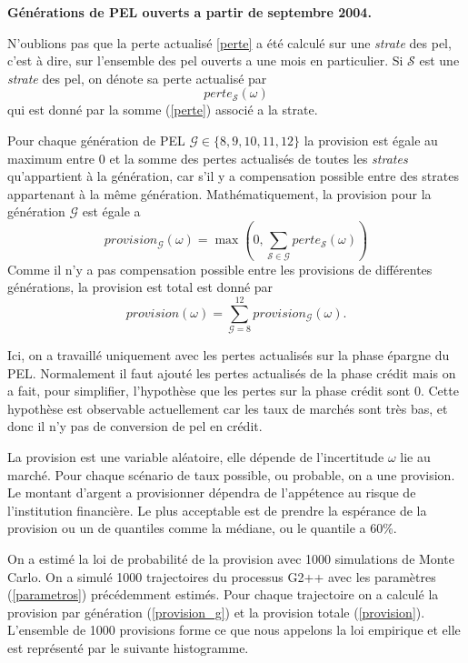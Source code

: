 \documentclass[12pt, a4paper]{book}
\begin{document}
\begin{table}[h!]
	\caption{\bf Générations de PEL ouverts a partir de septembre 2004.}
	\bigskip	
	\label{generation_pel}
	\centering
\end{table}

N'oublions pas que la perte actualisé \ref{perte} a été calculé sur une {\it strate} des pel, c'est à dire, sur l'ensemble des pel ouverts a une mois en particulier. Si $\mathcal{S}$ est une {\it strate} des pel, on dénote sa perte actualisé par 
$$ perte_{\mathcal S}(\omega)$$
qui est donné par la somme (\ref{perte}) associé a la strate.

Pour chaque génération de PEL $\mathcal{G} \in \{8, 9, 10, 11, 12\}$ la provision est égale au maximum entre $0$ et la somme des pertes actualisés de toutes les {\it strates} qu'appartient à la génération, car s'il y a compensation possible entre des strates appartenant à la même génération. Mathématiquement, la provision pour la génération $\mathcal{G}$ est égale a
\begin{equation}
\label{provision_g}
provision_\mathcal{G}(\omega) = \max\left(0, \sum_{\mathcal{S}\in \mathcal{G}}perte_\mathcal{S}(\omega)\right)
\end{equation}
Comme il n'y a pas compensation possible entre les provisions de différentes générations, la provision est total est donné par
\begin{equation}
\label{provision}
provision(\omega)=\sum_{\mathcal{G}=8}^{12} provision_\mathcal{G}(\omega).
\end{equation}

Ici, on a travaillé uniquement avec les pertes actualisés sur la phase épargne du PEL. Normalement il faut ajouté les pertes actualisés de la phase crédit mais on a fait, pour simplifier, l'hypothèse que les pertes sur la phase crédit sont 0. Cette hypothèse est observable actuellement car les taux de marchés sont très bas, et donc il n'y pas de conversion de pel en crédit.

La provision est une variable aléatoire, elle dépende de l'incertitude $\omega$ lie au marché. Pour chaque scénario de taux possible, ou probable, on a une provision. Le montant d'argent a provisionner dépendra de l'appétence au risque de l'institution financière. Le plus acceptable est de prendre la espérance de la provision ou un de quantiles comme la médiane, ou le quantile a 60\%.

On a estimé la loi de probabilité de la provision avec 1000 simulations de Monte Carlo. On a simulé 1000 trajectoires du processus G2++ avec les paramètres (\ref{parametros}) précédemment estimés. Pour chaque trajectoire on a calculé la provision par génération (\ref{provision_g}) et la provision totale (\ref{provision}). L'ensemble de 1000 provisions forme ce que nous appelons la loi empirique et elle est représenté par le suivante histogramme.  
\end{document}
